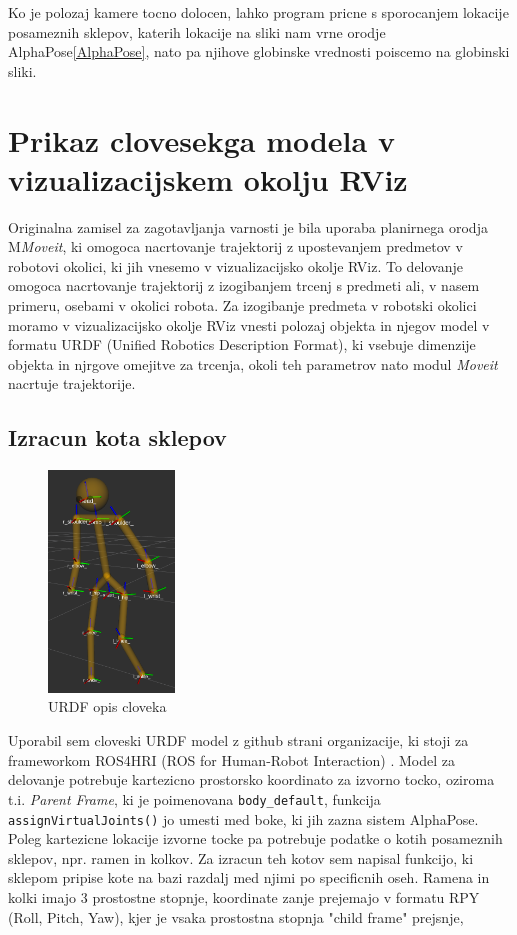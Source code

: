 \documentclass[a4paper,twoside,openright,12pt,slovene]{book}
\begin{document}
Ko je polozaj kamere tocno dolocen, lahko program pricne s sporocanjem lokacije posameznih sklepov, katerih lokacije na sliki nam vrne orodje AlphaPose\ref{AlphaPose}, nato pa njihove globinske vrednosti poiscemo na globinski sliki.

\section{Prikaz clovesekga modela v vizualizacijskem okolju RViz}
Originalna zamisel za zagotavljanja varnosti je bila uporaba planirnega orodja M\textit{Moveit}, ki omogoca nacrtovanje trajektorij z upostevanjem predmetov v robotovi okolici, ki jih vnesemo v vizualizacijsko okolje RViz. To delovanje omogoca nacrtovanje trajektorij z izogibanjem trcenj s predmeti ali, v nasem primeru, osebami v okolici robota. Za izogibanje predmeta v robotski okolici moramo v vizualizacijsko okolje RViz vnesti polozaj objekta in njegov model v formatu URDF (Unified Robotics Description Format), ki vsebuje dimenzije objekta in njrgove omejitve za trcenja, okoli teh parametrov nato modul \textit{Moveit} nacrtuje trajektorije.

\subsection{Izracun kota sklepov}
\begin{figure}
  \begin{center}
    \includegraphics[width=0.3\textwidth]{Slike/rviz_human.png}
  \end{center}
  \caption{URDF opis cloveka}
\end{figure}
Uporabil sem cloveski URDF model z github strani organizacije, ki stoji za frameworkom ROS4HRI (ROS for Human-Robot Interaction) \cite{ros4hri}. Model za delovanje potrebuje kartezicno prostorsko koordinato za izvorno tocko, oziroma t.i. \textit{Parent Frame}, ki je poimenovana \verb|body_default|, funkcija \verb|assignVirtualJoints()| jo umesti med boke, ki jih zazna sistem AlphaPose. Poleg kartezicne lokacije izvorne tocke pa potrebuje podatke o kotih posameznih sklepov, npr. ramen in kolkov. Za izracun teh kotov sem napisal funkcijo, ki sklepom pripise kote na bazi razdalj med njimi po specificnih oseh. Ramena in kolki imajo 3 prostostne stopnje, koordinate zanje prejemajo v formatu RPY (Roll, Pitch, Yaw), kjer je vsaka prostostna stopnja "child frame" prejsnje, 
\end{document}
